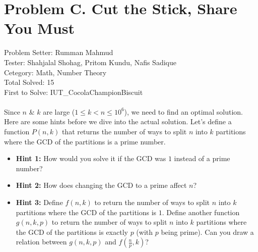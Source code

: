 \section*{Problem C. Cut the Stick, Share You Must}
Problem Setter: Rumman Mahmud \\
Tester: Shahjalal Shohag, Pritom Kundu, Nafis Sadique \\
Cetegory: Math, Number Theory \\
Total Solved: 15 \\
First to Solve: IUT\_CocolaChampionBiscuit \\
\\
Since $n$ \& $k$ are large ($1 \le k < n \le 10^6$), we need to find an optimal solution.
Here are some hints before we dive into the actual solution.
Let’s define a function $P(n,k)$ that returns the number of ways to split $n$ into $k$ partitions 
where the GCD of the partitions is a prime number.
\begin{itemize}
  \item \textbf{Hint 1:} How would you solve it if the GCD was $1$ instead of a prime number?
  \item \textbf{Hint 2:} How does changing the GCD to a prime affect $n$?
  \item \textbf{Hint 3:} Define $f(n,k)$ to return the number of ways to split $n$ into $k$
    partitions where the GCD of the partitions is $1$. Define another function $g(n,k,p)$ to
    return the number of ways to split $n$ into $k$ partitions where the GCD of the partitions
    is exactly $p$ (with $p$ being prime). Can you draw a relation between $g(n,k,p)$ and $f(\frac{n}{p},k)$?
\end{itemize}

